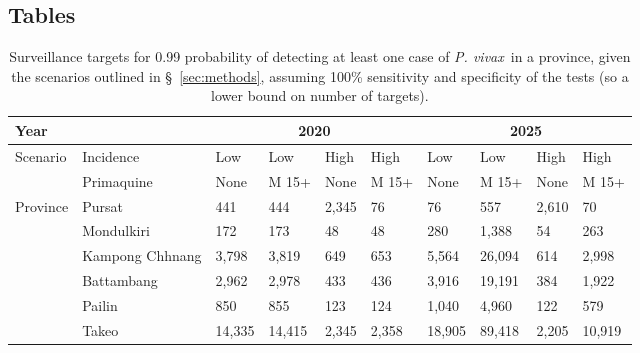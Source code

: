 \documentclass[doublespacing]{bmcart}
\newcommand{\pv}{\textit{P. vivax}}
\begin{document}
\begin{backmatter}

\section*{Tables}
\begin{table}[h!] 
\caption{Surveillance targets for 0.99 probability of detecting at least one case of \pv~in a province, given the scenarios outlined in \S~\ref{sec:methods}, assuming 100\% sensitivity and specificity of the tests (so a lower bound on number of targets).}\label{tab:surveillance}
      \begin{tabular}{|l|l|l|l|l|l|l|l|l|l|}
       \hline 
       \multicolumn{2}{|l|}{Year} & \multicolumn{4}{|c|}{2020} & \multicolumn{4}{|c|}{2025} \\ \hline
       \multirow{2}{*}{Scenario} & Incidence & Low & Low & High & High & Low & Low & High & High \\ %
                                 & Primaquine & None & M 15+ & None & M 15+ & None & M 15+ & None & M 15+ \\ \hline
    \multirow{6}{*}{Province} & Pursat & 441 & 444 & 2,345 & 76 & 76 & 557 & 2,610 & 70 \\ %
                              & Mondulkiri & 172 & 173 & 48 & 48 & 280 & 1,388 & 54 & 263 \\ %
                              & Kampong Chhnang & 3,798 & 3,819 & 649 & 653 & 5,564 & 26,094 & 614 & 2,998 \\ %
                              & Battambang & 2,962 & 2,978 & 433 & 436 & 3,916 & 19,191 & 384 & 1,922 \\ %
                              & Pailin & 850 & 855 & 123 & 124 & 1,040 & 4,960 & 122 & 579 \\ %
                              & Takeo & 14,335 & 14,415 & 2,345 & 2,358 & 18,905 & 89,418 & 2,205 & 10,919 \\ \hline 
      \end{tabular}
\end{table}



\end{backmatter}
\end{document}
